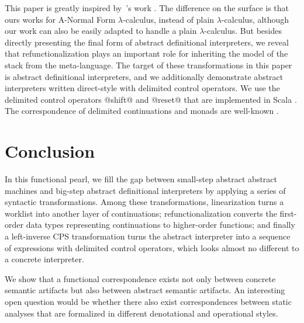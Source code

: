 \documentclass[acmsmall, review]{acmart}\settopmatter{}
\begin{document}
This paper is greatly inspired by~\citeauthor{darais2017abstracting}'s work \cite{darais2017abstracting}.
The difference on the surface is that ours works for A-Normal Form $\lambda$-calculus, instead of plain 
$\lambda$-calculus, although our work can also be easily adapted to handle a plain $\lambda$-calculus. 
But besides directly presenting the final form of abstract definitional interpreters, we reveal that 
refunctionalization plays an important role for inheriting the model of the stack from the meta-language. 
The target of these transformations in this paper is abstract definitional interpreters, and we 
additionally demonstrate abstract interpreters written direct-style with delimited control operators. 
We use the delimited control operators @shift@ and @reset@ that are implemented in Scala 
\cite{rompf2009implementing}. The correspondence of delimited continuations and monads are well-known
\cite{Danvy:1990:AC:91556.91622, wadler1992essence, danvy1992representing, moggi1991notions}.

\section{Conclusion}\label{sec:conclusion}


In this functional pearl, we fill the gap between small-step abstract abstract machines
and big-step abstract definitional interpreters by applying a series of syntactic 
transformations. Among these transformations, linearization turns a worklist into another
layer of continuations; refunctionalization converts the first-order data types representing
continuations to higher-order functions; and finally a left-inverse CPS transformation turns
the abstract interpreter into a sequence of expressions with delimited control operators,
which looks almost no different to a concrete interpreter.

We show that a functional correspondence exists not only between concrete semantic artifacts
but also between abstract semantic artifacts. An interesting open question would
be whether there also exist correspondences between static analyses that are formalized 
in different denotational and operational styles.
\end{document}
